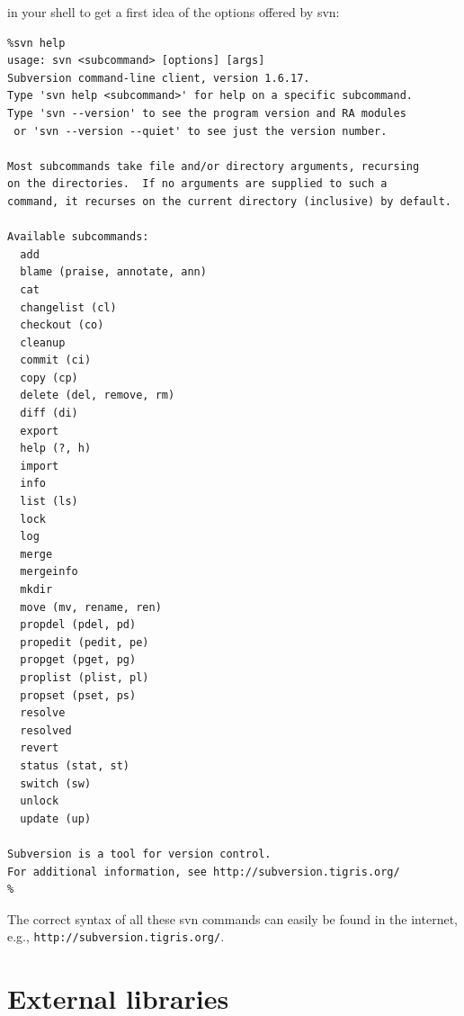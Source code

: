 \documentclass[11pt]{article}
\begin{document}
\noindent in your shell to get a first idea of the options offered by svn:

\begin{scriptsize} 
\begin{verbatim} 
%svn help
usage: svn <subcommand> [options] [args]
Subversion command-line client, version 1.6.17.
Type 'svn help <subcommand>' for help on a specific subcommand.
Type 'svn --version' to see the program version and RA modules
 or 'svn --version --quiet' to see just the version number.

Most subcommands take file and/or directory arguments, recursing
on the directories.  If no arguments are supplied to such a
command, it recurses on the current directory (inclusive) by default.

Available subcommands:
  add
  blame (praise, annotate, ann)
  cat
  changelist (cl)
  checkout (co)
  cleanup
  commit (ci)
  copy (cp)
  delete (del, remove, rm)
  diff (di)
  export
  help (?, h)
  import
  info
  list (ls)
  lock
  log
  merge
  mergeinfo
  mkdir
  move (mv, rename, ren)
  propdel (pdel, pd)
  propedit (pedit, pe)
  propget (pget, pg)
  proplist (plist, pl)
  propset (pset, ps)
  resolve
  resolved
  revert
  status (stat, st)
  switch (sw)
  unlock
  update (up)

Subversion is a tool for version control.
For additional information, see http://subversion.tigris.org/
%
\end{verbatim} 
\end{scriptsize} 

\noindent The correct syntax of all these svn commands can easily be found
in the internet, e.g., {\tt http://subversion.tigris.org/}.


\section{External libraries}\label{libs}
\end{document}
